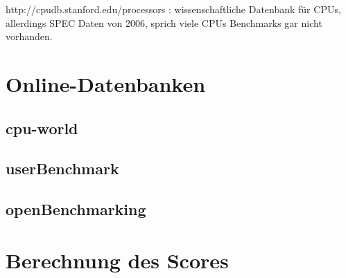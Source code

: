 http://cpudb.stanford.edu/processors : wissenschaftliche Datenbank für CPUs, allerdings SPEC Daten von 2006, sprich viele CPUs Benchmarks gar nicht vorhanden.


\section{Online-Datenbanken}
\label{sec:database}

\subsection{cpu-world}
\label{subsec:cpuworld}

\subsection{userBenchmark}
\label{subsec:userbenchmark}

\subsection{openBenchmarking}
\label{subsec:openbenchmarking}



\section{Berechnung des Scores}
\label{sec:score}